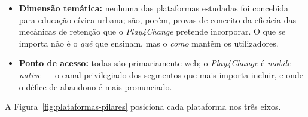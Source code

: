 \begin{itemize}
    \item \textbf{Dimensão temática:} nenhuma das plataformas estudadas foi concebida para educação cívica urbana; são, porém, provas de conceito da eficácia das mecânicas de retenção que o \emph{Play4Change} pretende incorporar. O que se importa não é o \emph{quê} que ensinam, mas o \emph{como} mantêm os utilizadores.
    \item \textbf{Ponto de acesso:} todas são primariamente web; o \emph{Play4Change} é \emph{mobile-native} --- o canal privilegiado dos segmentos que mais importa incluir, e onde o défice de abandono é mais pronunciado.
\end{itemize}

A Figura~\ref{fig:plataformas-pilares} posiciona cada plataforma nos três eixos.

